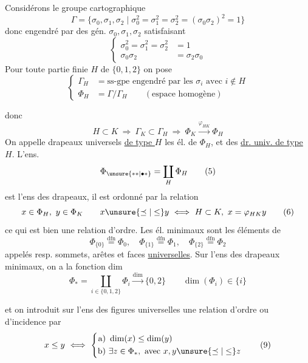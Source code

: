 Considérons le groupe cartographique
\[
 \Gamma=\{\sigma_0,\sigma_1,\sigma_2\mid\sigma_0^2=\sigma_1^2=\sigma_2^2=(\sigma_0\sigma_2)^2=1\}\tag*{(1)}
\]
donc engendré par des gén. $\sigma_0,\sigma_1,\sigma_2$ satisfaisant
\[
 \left\{\begin{aligned}
 \sigma_0^2=\sigma_1^2=\sigma_2^2&=1\\
 \sigma_0\sigma_2&=\sigma_2\sigma_0
 \end{aligned}\right.\tag*{(2)}
\]
 Pour toute partie finie   $H$ de $\{0,1,2\}$  on pose
\[
 \left\{\begin{aligned}
 \Gamma_H&=\text{ss-gpe engendré par les }\sigma_i\text{ avec }i\notin H\\
 \Phi_H&=\Gamma/\Gamma_H\qquad(\text{espace homogène})
 \end{aligned}\right.\tag*{(3)}
\]

donc
\[
 H\subset K\ \Rightarrow\ \Gamma_K\subset\Gamma_H\ \Rightarrow\ \Phi_K\xrightarrow{\varphi_{HK}}\Phi_H\tag*{(4)}
\]
On appelle drapeaux universels \uline{de type $H$} les él. de $\Phi_H$, et   des \uline{dr. univ. de type $H$}. L'ens.
\[
 \Phi_{\unsure{**|\bullet *}}=\coprod_H\Phi_H\tag*{(5)}
\]
est l'ens des drapeaux, il est ordonné par la relation
\[
 x\in\Phi_H,\ y\in\Phi_K\qquad x\unsure{\preceq|\leq}y\ \Longleftrightarrow\ H\subset K,\ x=\varphi_{HK}y\tag*{(6)}
\]
ce qui est bien une relation d'ordre. Les él. minimaux sont les éléments de
\[
 \Phi_{\{0\}}\overset{\mathrm{dfn}}=\Phi_0,\quad
 \Phi_{\{1\}}\overset{\mathrm{dfn}}=\Phi_1,\quad
 \Phi_{\{2\}}\overset{\mathrm{dfn}}=\Phi_2\tag*{(7)}
\]
appelés resp. sommets, arêtes et faces \uline{universelles}. Sur l'ens des drapeaux minimaux, on a la fonction dim
\[
 \Phi_* =\coprod_{i\in\{0,1,2\}}\Phi_i\xrightarrow{\dim}\{0,2\}\qquad\dim(\Phi_i)\in\{i\}\tag*{(8)}
\]

et on introduit sur l'ens  des figures universelles une relation d'ordre ou d'incidence par
\[
 x\leq y\ \Longleftrightarrow\
 \left\{\begin{aligned}
 \text{a)}\ &\dim(x)\leq\dim(y)\\
 \text{b)}\ &\exists z\in\Phi_*,\ \text{avec }x,y\unsure{\preceq|\leq}z
 \end{aligned}\right.\tag*{(9)}
\]

